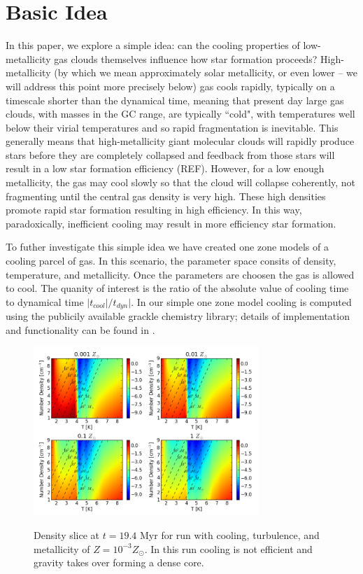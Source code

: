 \documentclass[useAMS,usenatbib]{mn2e}
\begin{document}
%
\section{Basic Idea}
\label{sec:basic}

In this paper, we explore a simple idea: can the cooling properties of low-metallicity gas clouds themselves influence how star formation proceeds?  High-metallicity (by which we mean approximately solar metallicity, or even lower -- we will address this point more precisely below) gas cools rapidly, typically on a timescale shorter than the dynamical time, meaning that present day large gas clouds, with masses in the GC range, are typically ``cold", with temperatures well below their virial temperatures and so rapid fragmentation is inevitable.  This generally means that high-metallicity giant molecular clouds will rapidly produce stars before they are completely collapsed and feedback from those stars will result in a low star formation efficiency (REF).  However, for a low enough metallicity, the gas may cool slowly so that the cloud will collapse coherently, not fragmenting until the central gas density is very high.  These high densities promote rapid star formation resulting in high efficiency.  In this way, paradoxically, inefficient cooling may result in more efficiency star formation.

To futher investigate this simple idea we have created one zone models of a cooling parcel of gas. In 
this scenario, the parameter space consits of density, temperature, and metallicity. Once the parameters
are choosen the gas is allowed to cool. The quanity of interest is the ratio of the absolute value of cooling
time to dynamical time $|t_{cool}|/t_{dyn}|$. In our simple one zone model cooling is computed using the
publicily available grackle chemistry library; details of implementation and functionality can be found
in \cite{Bryan2013}.
\begin{figure}
\begin{center}
\mbox{\includegraphics[width=8.5cm]{Images/cooling_to_freefall_no_background}}
\end{center}
\caption{\label{fig:cooling_to_freefall}} Density slice at $t=19.4$ Myr for run with
cooling, turbulence, and metallicity of $Z=10^{-3}Z_\odot$. In this run cooling is
not efficient and gravity takes over forming a dense core. 
\end{figure}
\end{document}

